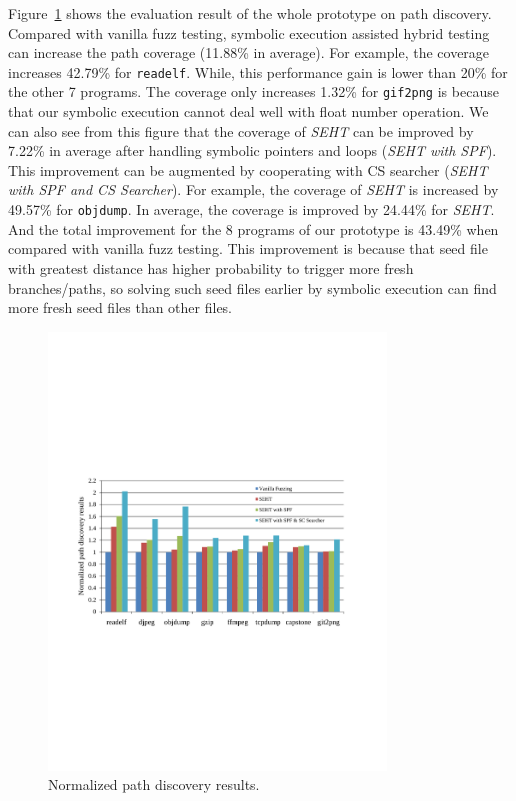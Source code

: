 Figure~\ref{path-overall-rsults} shows the evaluation result of the whole prototype on path discovery. 
 Compared with vanilla fuzz testing, symbolic execution assisted hybrid testing can increase the path coverage (11.88\% in average).
  For example, the coverage increases 42.79\% for \texttt{readelf}. While, this performance gain is lower than 20\% for the other 7 programs. The coverage only increases 1.32\%  for \texttt{gif2png} is because that our symbolic execution cannot deal well with float number operation.
 We can also see from this figure that the coverage of \textit{SEHT} can be improved by 7.22\% in average after handling symbolic pointers and loops (\textit{SEHT with SPF}). 
 This improvement can be augmented by cooperating with CS searcher (\textit{SEHT with SPF and CS Searcher}). 
  For example, the coverage of \textit{SEHT} is increased by 49.57\% for \texttt{objdump}. In average, the coverage is improved by 24.44\% for \textit{SEHT}. 
 And the total improvement for the 8 programs of our prototype is 43.49\% when compared with vanilla fuzz testing.
  This improvement is because that seed file with greatest distance has higher probability to trigger more fresh branches/paths, so solving such seed files earlier by symbolic execution can find more fresh seed files than other files. 
  

      
\begin{figure}
\begin{center}
\includegraphics[width=0.8\textwidth]{figures/path-discovery-SPF-CS-all.pdf} 
\caption{Normalized path discovery results.}\label{path-overall-rsults}
\end{center}
\end{figure}


